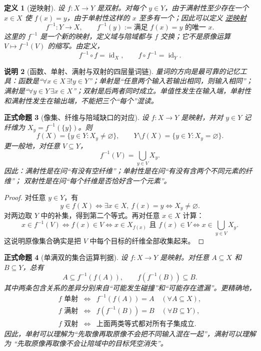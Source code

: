 \documentclass[UTF8,fontset=none,a4paper,11pt]{ctexart}
\theoremstyle{foundation-definition}
\newtheorem{definition}{定义}[section]
\theoremstyle{foundation-theorem}
\theoremstyle{foundation-proposition}
\newtheorem{proposition}[definition]{正式命题}
\theoremstyle{foundation-example}
\theoremstyle{foundation-remark}
\newtheorem{remark}[definition]{说明}
\theoremstyle{foundation-theorem}
\newcommand{\term}[2]{\hyperref[#1]{#2}}
\begin{document}
\begin{definition}[逆映射]\label{def:inverse-map}
设 \(f:X\to Y\) 是双射。对每个 \(y\in Y\)，由于满射性至少存在一个
\(x\in X\) 使 \(f(x)=y\)，由于单射性这样的 \(x\) 至多有一个；因此可以定义
\term{def:inverse-map}{逆映射}
\[
  f^{-1}:Y\longrightarrow X,
  \qquad f^{-1}(y):=\text{满足 }f(x)=y\text{ 的唯一 }x.
\]
这里的 \(f^{-1}\) 是一个新的映射，定义域与陪域都与 \(f\) 交换；它不是原像运算
\(V\mapsto f^{-1}(V)\) 的缩写。由定义，
\[
  f^{-1}\circ f=\operatorname{id}_X,
  \qquad f\circ f^{-1}=\operatorname{id}_Y.
\]
\end{definition}

\begin{remark}[函数、单射、满射与双射的四层量词链]\label{rem:map-quantifier-chain}
量词的方向是最可靠的记忆工具：函数是“\(\forall x\in X\,\exists!y\in Y\)”；单射是“任意两个输入若输出相同，则输入相同”；满射是“\(\forall y\in Y\,\exists x\in X\)”；双射是后两者同时成立。单值性发生在输入端，单射性和满射性发生在输出端，不能把三个“每个”混读。
\end{remark}

\begin{proposition}[像集、纤维与陪域缺口的对应]\label{prop:image-fiber-criterion}
设 \(f:X\to Y\) 是映射，并对 \(y\in Y\) 记纤维为
\(X_y=f^{-1}(\{y\})\)。则
\[
  f(X)=\{y\in Y:X_y\ne\varnothing\},
  \qquad
  Y\setminus f(X)=\{y\in Y:X_y=\varnothing\}.
\]
更一般地，对任意 \(V\subseteq Y\)，
\[
  f^{-1}(V)=\bigcup_{y\in V}X_y.
\]
因此：满射性是在问“有没有空纤维”；单射性是在问“有没有含两个不同元素的纤维”；
双射性是在问“每个纤维是否恰好含一个元素”。
\end{proposition}

\begin{proof}
对任意 \(y\in Y\)，有
\[
 y\in f(X)
 \Longleftrightarrow \exists x\in X,\ f(x)=y
 \Longleftrightarrow X_y\ne\varnothing.
\]
对两边取 \(Y\) 中的补集，得到第二个等式。再对任意 \(x\in X\) 计算：
\[
 x\in f^{-1}(V)
 \Longleftrightarrow f(x)\in V
 \Longleftrightarrow x\in X_{f(x)}\text{ 且 }f(x)\in V
 \Longleftrightarrow x\in\bigcup_{y\in V}X_y.
\]
这说明原像集合确实是把 \(V\) 中每个目标的纤维全部收集起来。
\end{proof}

\begin{proposition}[单满双的集合运算判据]\label{prop:map-set-theoretic-criterion}
设 \(f:X\to Y\) 是映射。对任意 \(A\subseteq X\) 和 \(B\subseteq Y\)，总有
\[
A\subseteq f^{-1}(f(A)),\qquad f(f^{-1}(B))\subseteq B.
\]
其中两条包含关系的差异分别来自“可能发生碰撞”和“可能存在遗漏”。更精确地，
\[
\begin{array}{rcl}
f\text{ 单射}
&\Longleftrightarrow&
f^{-1}(f(A))=A\quad(\forall A\subseteq X),\\[0.35em]
f\text{ 满射}
&\Longleftrightarrow&
f(f^{-1}(B))=B\quad(\forall B\subseteq Y),\\[0.35em]
f\text{ 双射}
&\Longleftrightarrow&
\text{上面两类等式都对所有子集成立}.
\end{array}
\]
因此，单射可以理解为“先取像再取原像不会把不同输入混在一起”，满射可以理解为
“先取原像再取像不会让陪域中的目标凭空消失”。
\end{proposition}
\end{document}
